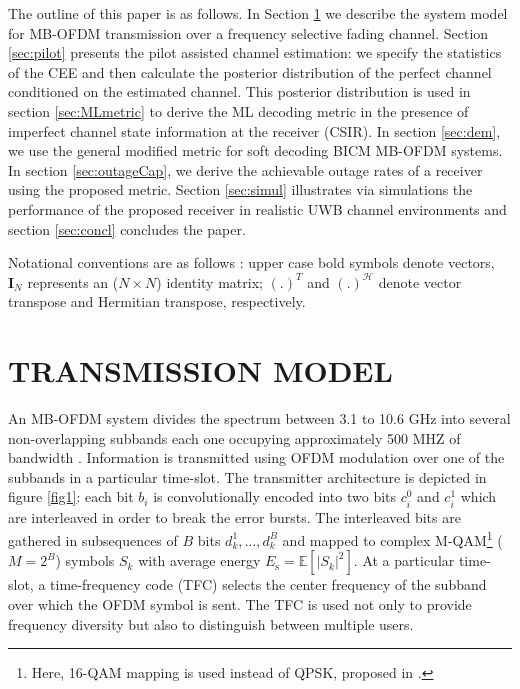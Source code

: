 \documentclass{article}
\begin{document}
The outline of this paper is as follows. In Section \ref{sec:sysmodel} we describe the system model for MB-OFDM transmission over a frequency selective fading channel. Section \ref{sec:pilot} presents the pilot assisted channel estimation: we specify the statistics of the CEE and then calculate the posterior distribution of the perfect channel conditioned on the estimated channel. This posterior distribution is used in section \ref{sec:MLmetric} to derive the ML decoding metric in the presence of imperfect channel state information at the receiver (CSIR). In section \ref{sec:dem}, we use the general modified metric for soft decoding  BICM MB-OFDM systems. In section \ref{sec:outageCap}, we derive the achievable outage rates of a receiver using the proposed metric. 
Section \ref{sec:simul} illustrates via simulations the performance of the proposed receiver in realistic UWB channel environments and section \ref{sec:concl} concludes the paper.

Notational conventions are as follows : upper case bold symbols denote vectors, $\mathbf{I}_N$ represents an ($N \times N$) identity matrix; $(.)^T$ and $(.)^{\mathcal{H}}$ denote vector transpose and Hermitian transpose, respectively.   
\section{TRANSMISSION MODEL}
\label{sec:sysmodel}
An MB-OFDM system divides the spectrum between 3.1 to 10.6 GHz into several
non-overlapping subbands each one occupying approximately 500 MHZ of bandwidth
\cite{batra_jour}. Information is transmitted using OFDM modulation over one of the subbands in a particular time-slot. The transmitter architecture is depicted in figure \ref{fig1}: each bit $b_i$ is convolutionally encoded into two bits $c_i^0$ and $c_i^1$ which are interleaved in order to break the error bursts. The interleaved bits are gathered in subsequences of $B$ bits $d_k^1,\ldots,d_k^B$ and mapped to complex M-QAM\footnote[1]{Here, 16-QAM mapping is used instead of QPSK, proposed in \cite{norme_mb}.} ($M=2^B$) symbols $S_k$ with average energy $E_\mathrm{s}=\mathbb{E}[|S_k|^2]$. At a particular time-slot, a time-frequency code (TFC) selects the center frequency of the subband over which the OFDM symbol is sent. The TFC is used not only to provide frequency diversity but also to distinguish between multiple users.  
\end{document}
